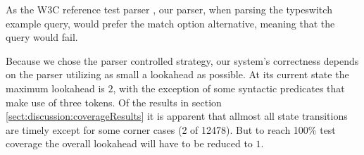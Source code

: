 As the W3C reference test parser \cite{parserTestPage}, our parser, when parsing the typeswitch example query, would prefer the match option alternative, meaning that the query would fail.

Because we chose the parser controlled strategy, our system's correctness
depends on the parser utilizing as small a lookahead as possible. At its current state the maximum lookahead is $2$, with the exception of some syntactic predicates that make use of three tokens. Of the results in section \ref{sect:discussion:coverageResults} it is apparent that allmost all state transitions are timely except for some corner cases (2 of 12478). But to reach 100\% test coverage the overall lookahead will have to be reduced to $1$. 
